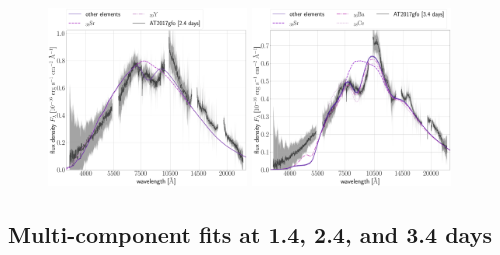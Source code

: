\documentclass[twocolumn, twocolappendix]{aastex63}
\newcommand\redbf[1]{\textbf{\textcolor{red}{#1}}}
\begin{document}
\begin{figure}[!ht]
    \centering
    \includegraphics[width=0.47\textwidth]{figs/230409_234104_leaveoneout_all_TARDIS_evals_label-interest-38-39.png}
    \includegraphics[width=0.47\textwidth]{figs/230626_170245_leaveoneout_all_TARDIS_evals_label-interest-38-56-58.png}
    \label{fig:leave_out_pref}
\end{figure}



\subsection{Multi-component fits at 1.4, 2.4, and 3.4 days}\label{ssc:1.4_2.4_3.4_multi_fits}



    
\end{document}
